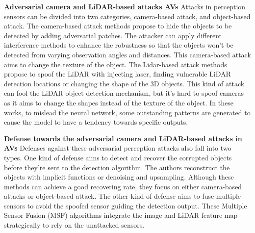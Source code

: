 \textbf{Adversarial camera and LiDAR-based attacks AVs}
Attacks in perception sensors can be divided into two categories, camera-based attack, and object-based attack. The
camera-based attack methods\cite{7, 9, 23} propose to hide the
objects to be detected by adding adversarial patches. The attacker
can apply different interference methods to enhance the
robustness so that the objects won’t be detected from varying
observation angles and distances. This camera-based attack
aims to change the texture of the object\cite{msf-adv}. The Lidar-based
attack methods\cite{4, 6, 19, 25} propose to spoof the LiDAR with
injecting laser\cite{6}, finding vulnerable LiDAR detection locations\cite{25} or changing the shape of the 3D objects\cite{4}. This
kind of attack can fool the LiDAR object detection mechanism,
but it’s hard to spoof cameras as it aims to change the shapes
instead of the texture of the object\cite{msf-adv}. 
In these works, to mislead the neural network, some outstanding patterns are generated
to cause the model to have a tendency towards specific outputs.

\textbf{Defense towards the adversarial camera and LiDAR-based
attacks in AVs}
Defenses against these adversarial perception attacks also
fall into two types. One kind of defense\cite{if-defense, 22, 24} aims to
detect and recover the corrupted objects before they’re sent
to the detection algorithm. The authors reconstruct the objects
with implicit functions\cite{if-defense} or denoising and upsampling\cite{24}.
Although these methods can achieve a good recovering rate,
they focus on either camera-based attacks or object-based
attack. The other kind of defense aims to fuse multiple sensors\cite{10, 15, 16, 21} to avoid the spoofed sensor guiding the
detection output. These Multiple Sensor Fusion (MSF) algorithms integrate the image and LiDAR feature map 
strategically to rely on the unattacked sensors.


